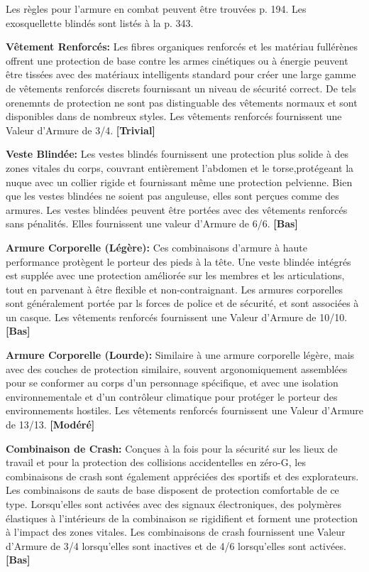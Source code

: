 Les règles pour l'armure en combat peuvent être trouvées p. 194. Les exosquellette blindés sont listés à la p. 343. 

\textbf{Vêtement Renforcés:} Les fibres organiques renforcés et les matériau fullérènes offrent une protection de base contre les armes cinétiques ou à énergie peuvent être tissées avec des matériaux intelligents standard pour créer une large gamme de vêtements renforcés discrets fournissant un niveau de sécurité correct. De tels orenemnts de protection ne sont pas distinguable des vêtements normaux et sont disponibles dans de nombreux styles. Les vêtements renforcés fournissent une Valeur d'Armure de 3/4. \textbf{[Trivial]} 

\textbf{Veste Blindée:} Les vestes blindés fournissent une protection plus solide à des zones vitales du corps, couvrant entièrement l'abdomen et le torse,protégeant la nuque avec un collier rigide et fournissant même une protection pelvienne. Bien que les vestes blindées ne soient pas anguleuse, elles sont perçues comme des armures. Les vestes blindées peuvent être portées avec des vêtements renforcés sans pénalités. Elles fournissent une valeur d'Armure de 6/6. \textbf{[Bas]} 

\textbf{Armure Corporelle (Légère):} Ces combinaisons d'armure à haute performance protègent le porteur des pieds à la tête. Une veste blindée intégrés est supplée avec une protection améliorée sur les membres et les articulations, tout en parvenant à être flexible et non-contraignant. Les armures corporelles sont généralement portée par ls forces de police et de sécurité, et sont associées à un casque. Les vêtements renforcés fournissent une Valeur d'Armure de 10/10. \textbf{[Bas]} 

\textbf{Armure Corporelle (Lourde):} Similaire à une armure corporelle légère, mais avec des couches de protection similaire, souvent argonomiquement assemblées pour se conformer au corps d'un personnage spécifique, et avec une isolation environnementale et d'un contrôleur climatique pour protéger le porteur des environnements hostiles. Les vêtements renforcés fournissent une Valeur d'Armure de 13/13. \textbf{[Modéré]} 

\textbf{Combinaison de Crash:} Conçues à la fois pour la sécurité sur les lieux de travail et pour la protection des collisions accidentelles en zéro-G, les combinaisons de crash sont également appréciées des sportifs et des explorateurs. Les combinaisons de sauts de base disposent de protection comfortable de ce type. Lorsqu'elles sont activées avec des signaux électroniques, des polymères élastiques à l'intérieurs de la combinaison se rigidifient et forment une protection à l'impact des zones vitales. Les combinaisons de crash fournissent une Valeur d'Armure de 3/4 lorsqu'elles sont inactives et de 4/6 lorsqu'elles sont activées. \textbf{[Bas]} 

